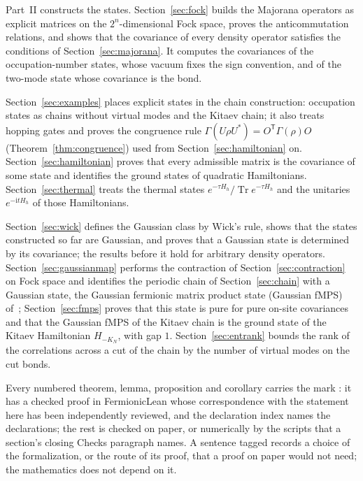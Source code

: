 \documentclass[11pt]{article}
\numberwithin{equation}{section}
\newcommand{\motiv}[1]{#1}
\newcommand{\revtag}[1]{#1}
\newcommand{\revs}[1]{#1}
\theoremstyle{definition}
\theoremstyle{remark}
\theoremstyle{plain}
\newcommand{\ii}{\mathrm i}
\newcommand{\T}{\mathsf T}
\newcommand{\tr}{\operatorname{Tr}}
\begin{document}
\medskip
\noindent\motiv{Part~II constructs the states. Section~\ref{sec:fock} builds the Majorana
operators as explicit matrices on the $2^n$-dimensional Fock space, proves the
anticommutation relations, and shows that the covariance of every density operator satisfies
the conditions of Section~\ref{sec:majorana}. It computes the covariances of the
occupation-number states, whose vacuum fixes the sign convention, and of the two-mode state
whose covariance is the bond.}

\medskip
\noindent\motiv{Section~\ref{sec:examples} places explicit states in the chain construction: occupation states as
chains without virtual modes \revs{and the Kitaev chain; it also treats hopping gates and proves the
congruence rule $\Gamma(U\rho U^*)=O^{\T}\Gamma(\rho)O$ (Theorem~\ref{thm:congruence}) used from
Section~\ref{sec:hamiltonian} on}. Section~\ref{sec:hamiltonian}
proves that every admissible matrix is the covariance of some state and identifies the ground
states of quadratic Hamiltonians. Section~\ref{sec:thermal} treats the thermal states
$e^{-\tau H_h}/\tr e^{-\tau H_h}$ and the unitaries $e^{-\ii tH_h}$ of those Hamiltonians.}

\medskip
\noindent\motiv{Section~\ref{sec:wick} defines the Gaussian class by Wick's rule, shows that the states
constructed so far are Gaussian, and proves that a Gaussian state is determined by its
covariance; the results before it hold for arbitrary density operators.
Section~\ref{sec:gaussianmap} performs the contraction of Section~\ref{sec:contraction} on
Fock space and identifies the periodic chain of Section~\ref{sec:chain} with a Gaussian state, the
Gaussian fermionic matrix product state (Gaussian fMPS) of~\cite{ksvc};
Section~\ref{sec:fmps} proves that this state is pure for pure on-site covariances and that
the Gaussian fMPS of the Kitaev chain is the ground state of the Kitaev Hamiltonian
$H_{-K_N}$, with gap $1$. Section~\ref{sec:entrank} bounds the rank of the correlations
across a cut of the chain by the number of virtual modes on the cut bonds.}

\medskip
\noindent\motiv{\revs{Every numbered theorem, lemma, proposition and corollary carries the mark
\revtag{\FermionicLeanTag{}}: it has a checked proof in FermionicLean whose correspondence with the
statement here has been independently reviewed, and the declaration index names the declarations;
the rest is checked on paper, or numerically by the scripts that a section's closing Checks paragraph
names. A sentence tagged \FermionicArtefactTag{} records a choice of the formalization, or the route
of its proof, that a proof on paper would not need; the mathematics does not depend on it.}}
\end{document}
